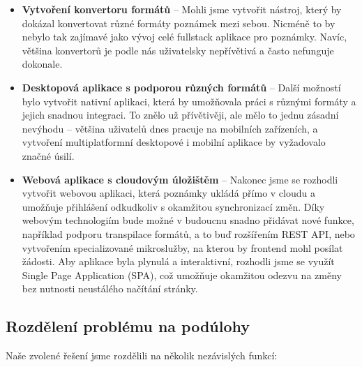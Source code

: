 \begin{itemize}
	\item \textbf{Vytvoření konvertoru formátů} -- Mohli jsme vytvořit nástroj, který by dokázal
	      konvertovat různé formáty poznámek mezi sebou. Nicméně to by nebylo tak
	      zajímavé jako vývoj celé fullstack aplikace pro poznámky. Navíc, většina
	      konvertorů je podle nás uživatelsky nepřívětivá a často nefunguje dokonale.

	\item \textbf{Desktopová aplikace s podporou různých formátů} -- Další možností bylo vytvořit
	      nativní aplikaci, která by umožňovala práci s různými formáty a jejich snadnou
	      integraci. To znělo už přívětivěji, ale mělo to jednu zásadní nevýhodu --
	      většina uživatelů dnes pracuje na mobilních zařízeních, a vytvoření
	      multiplatformní desktopové i mobilní aplikace by vyžadovalo značné úsilí.

	\item \textbf{Webová aplikace s cloudovým úložištěm} -- Nakonec jsme se rozhodli vytvořit
	      webovou aplikaci, která poznámky ukládá přímo v cloudu a umožňuje přihlášení
	      odkudkoliv s okamžitou synchronizací změn. Díky webovým technologiím bude možné
	      v budoucnu snadno přidávat nové funkce, například podporu transpilace formátů,
	      a to buď rozšířením REST API, nebo vytvořením specializované mikroslužby, na
	      kterou by frontend mohl posílat žádosti. Aby aplikace byla plynulá a interaktivní, rozhodli
	      jsme se využít Single Page Application (SPA), což umožňuje okamžitou odezvu na
	      změny bez nutnosti neustálého načítání stránky.
\end{itemize}

\subsection{Rozdělení problému na podúlohy}

Naše zvolené řešení jsme rozdělili na několik nezávislých funkcí:


